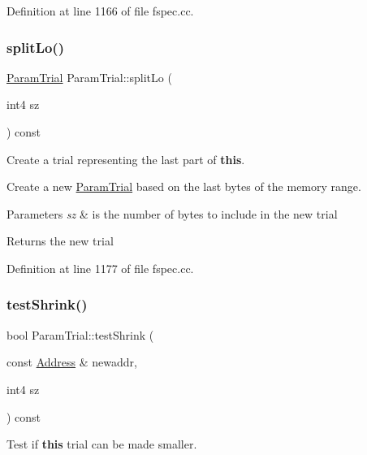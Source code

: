 Definition at line 1166 of file fspec.\+cc.

\mbox{\label{class_param_trial_a28244bdb2c9f412028e2ac390921cfa0}} 
\subsubsection{\texorpdfstring{splitLo()}{splitLo()}}
{\footnotesize\ttfamily \mbox{\hyperlink{class_param_trial}{Param\+Trial}} Param\+Trial\+::split\+Lo (\begin{DoxyParamCaption}\item[{int4}]{sz }\end{DoxyParamCaption}) const}



Create a trial representing the last part of {\bfseries{this}}. 

Create a new \mbox{\hyperlink{class_param_trial}{Param\+Trial}} based on the last bytes of the memory range. 
\begin{DoxyParams}{Parameters}
{\em sz} & is the number of bytes to include in the new trial \\
\hline
\end{DoxyParams}
\begin{DoxyReturn}{Returns}
the new trial 
\end{DoxyReturn}


Definition at line 1177 of file fspec.\+cc.

\mbox{\label{class_param_trial_a4bbb238263015249f040a7309e9335a6}} 
\subsubsection{\texorpdfstring{testShrink()}{testShrink()}}
{\footnotesize\ttfamily bool Param\+Trial\+::test\+Shrink (\begin{DoxyParamCaption}\item[{const \mbox{\hyperlink{class_address}{Address}} \&}]{newaddr,  }\item[{int4}]{sz }\end{DoxyParamCaption}) const}



Test if {\bfseries{this}} trial can be made smaller. 

